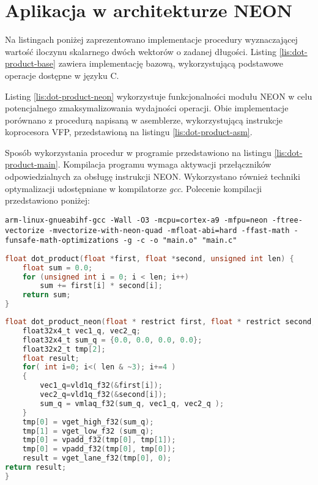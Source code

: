 \section{Aplikacja w architekturze NEON}
\label{cha:neon-source}


Na listingach poniżej zaprezentowano implementacje procedury wyznaczającej wartość iloczynu skalarnego dwóch wektorów o zadanej długości. Listing \ref{lis:dot-product-base} zawiera implementację bazową, wykorzystującą podstawowe operacje dostępne w języku C.

Listing \ref{lis:dot-product-neon} wykorzystuje funkcjonalności modułu NEON w celu potencjalnego zmaksymalizowania wydajności operacji. Obie implementacje porównano z procedurą napisaną w asemblerze, wykorzystującą instrukcje koprocesora VFP, przedstawioną na listingu \ref{lis:dot-product-asm}.

Sposób wykorzystania procedur w programie przedstawiono na listingu \ref{lis:dot-product-main}. Kompilacja programu wymaga aktywacji przełączników odpowiedzialnych za obsługę instrukcji NEON. Wykorzystano również techniki optymalizacji udostępniane w kompilatorze \textit{gcc}. Polecenie kompilacji przedstawiono poniżej:

\begin{lstlisting}[breaklines=true]
arm-linux-gnueabihf-gcc -Wall -O3 -mcpu=cortex-a9 -mfpu=neon -ftree-vectorize -mvectorize-with-neon-quad -mfloat-abi=hard -ffast-math -funsafe-math-optimizations -g -c -o "main.o" "main.c"
\end{lstlisting}

\begin{lstlisting}[breaklines=true, language=C, caption=Implementacja bazowa., label=lis:dot-product-base]
float dot_product(float *first, float *second, unsigned int len) {
	float sum = 0.0;
	for (unsigned int i = 0; i < len; i++)
		sum += first[i] * second[i];
	return sum;
}
\end{lstlisting}

\begin{lstlisting}[breaklines=true, language=C, caption=Implementacja w architekturze NEON. (Źródło: \cite{xilinx-neon}), label=lis:dot-product-neon]
float dot_product_neon(float * restrict first, float * restrict second, unsigned int len) {
	float32x4_t vec1_q, vec2_q;
	float32x4_t sum_q = {0.0, 0.0, 0.0, 0.0};
	float32x2_t tmp[2];
	float result;
	for( int i=0; i<( len & ~3); i+=4 )
	{
		vec1_q=vld1q_f32(&first[i]);
		vec2_q=vld1q_f32(&second[i]);
		sum_q = vmlaq_f32(sum_q, vec1_q, vec2_q );
	}
	tmp[0] = vget_high_f32(sum_q);
	tmp[1] = vget_low_f32 (sum_q);
	tmp[0] = vpadd_f32(tmp[0], tmp[1]);
	tmp[0] = vpadd_f32(tmp[0], tmp[0]);
	result = vget_lane_f32(tmp[0], 0);
return result;
}
\end{lstlisting}

